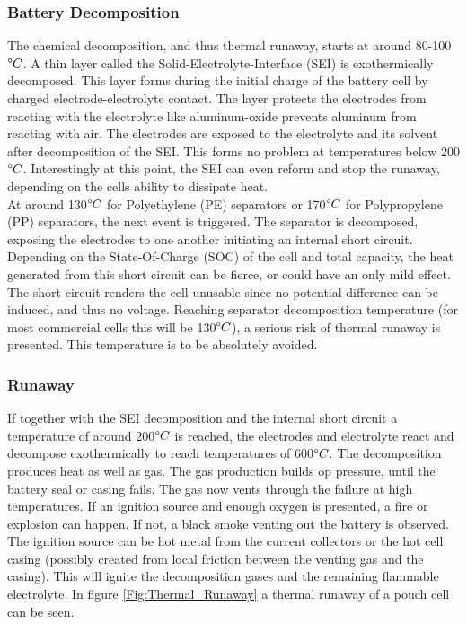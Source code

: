\subsubsection{Battery Decomposition}
The chemical decomposition, and thus thermal runaway, starts at around 80-100\textit{$\degree C$}. A thin layer called the Solid-Electrolyte-Interface (SEI) is exothermically decomposed\cite{FENG2018246}. This layer forms during the initial charge of the battery cell by charged electrode-electrolyte contact. The layer protects the electrodes from reacting with the electrolyte like aluminum-oxide prevents aluminum from reacting with air. The electrodes are exposed to the electrolyte and its solvent after decomposition of the SEI. This forms no problem at temperatures below 200 \textit{$\degree C$}. Interestingly at this point, the SEI can even reform and stop the runaway, depending on the cells ability to dissipate heat\cite{FENG2018246}. \\  
At around 130\textit{$\degree C$} for Polyethylene (PE) separators or 170\textit{$\degree C$} for Polypropylene (PP) separators, the next event is triggered. The separator is decomposed, exposing the electrodes to one another initiating an internal short circuit\cite{Mikolajczak2011}\cite{FENG2018246}. Depending on the State-Of-Charge (SOC) of the cell and total capacity, the heat generated from this short circuit can be fierce, or could have an only mild effect. The short circuit renders the cell unusable since no potential difference can be induced, and thus no voltage. Reaching separator decomposition temperature (for most commercial cells this will be 130\textit{$\degree C$}), a serious risk of thermal runaway is presented. This temperature is to be absolutely avoided.

\subsubsection{Runaway}
If together with the SEI decomposition and the internal short circuit a temperature of around 200\textit{$\degree C$} is reached, the electrodes and electrolyte react and decompose exothermically to reach temperatures of 600\textit{$\degree C$}. The decomposition produces heat as well as gas. The gas production builds op pressure, until the battery seal or casing fails. The gas now vents through the failure at high temperatures. If an ignition source and enough oxygen is presented, a fire or explosion can happen. If not, a black smoke venting out the battery is observed. The ignition source can be hot metal from the current collectors or the hot cell casing (possibly created from local friction between the venting gas and the casing). This will ignite the decomposition gases and the remaining flammable electrolyte\cite{Mikolajczak2011}. In figure \ref{Fig:Thermal_Runaway} a thermal runaway of a pouch cell can be seen.

